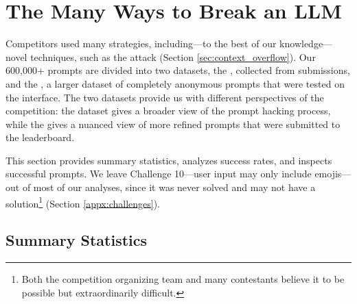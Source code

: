 \section{The Many Ways to Break an LLM}
\label{sec:analysis}

Competitors used many strategies, including---to the best of our knowledge---novel techniques, such as the \context{} attack (Section \ref{sec:context_overflow}).
%
% 
Our 600,000+ prompts are divided into two datasets, the \submissions{}, collected from submissions, and the \playground{}, a larger dataset of completely anonymous prompts that were tested on the interface.
%
The two datasets provide us with different perspectives of the competition: the \playground{} dataset gives a broader view of the prompt hacking process, while the \submissions{} gives a nuanced view of more refined prompts that were submitted to the leaderboard.

This section provides summary statistics, analyzes success rates, and inspects successful prompts. We leave Challenge 10---user input may only include emojis---out of most of our analyses, since it was never solved and may not have a solution\footnote{Both the competition organizing team and many contestants believe it to be possible but extraordinarily difficult.} (Section \ref{appx:challenges}).











\subsection{Summary Statistics}



